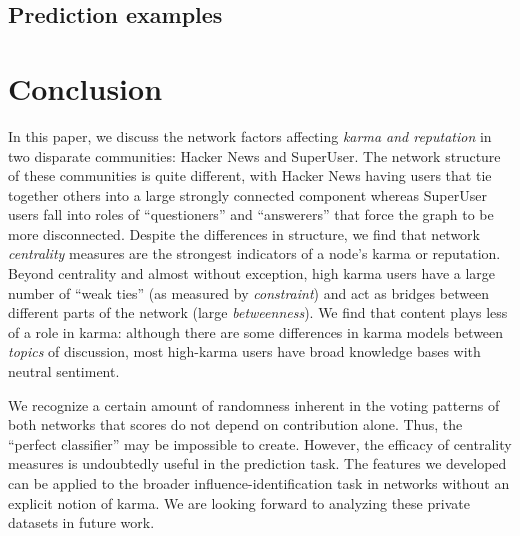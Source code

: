 \documentclass[11pt]{article}
\begin{document}
\subsection{Prediction examples}

\section{Conclusion}
\label{sec:conclusion}

In this paper, we discuss the network factors affecting \textit{karma and reputation}
in two disparate communities: Hacker News and
SuperUser. The network structure of these communities is quite different, with
Hacker News having users that tie together others into a large strongly
connected component whereas SuperUser users fall into roles of ``questioners''
and ``answerers'' that force the graph to be more disconnected. Despite the
differences in structure, we find that network \textit{centrality} measures are
the strongest indicators of a node's karma or reputation. Beyond centrality and
almost without exception, high karma users have a large number of ``weak ties''
(as measured by \textit{constraint}) and act as bridges between different parts
of the network (large \textit{betweenness}). We find that content plays less of a role
in karma: although there are some differences in karma models
between \textit{topics} of discussion, most high-karma users have broad
knowledge bases with neutral sentiment. 

We recognize a certain amount of randomness inherent in the voting patterns 
of both networks that scores do not depend on contribution alone. Thus, 
the ``perfect classifier'' may be  impossible to create. However, the efficacy 
of centrality measures  is undoubtedly useful in the prediction task. 
The features we developed can be applied to the broader influence-identification 
task in networks without an explicit notion of karma. We are looking forward
to analyzing these private datasets in future work.

{} 
\end{document}
